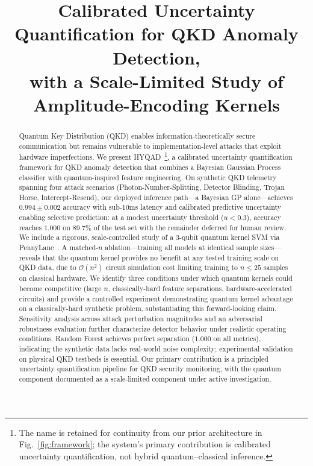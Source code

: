 \documentclass[conference,10pt]{IEEEtran}
\title{Calibrated Uncertainty Quantification for QKD Anomaly Detection,\\
with a Scale-Limited Study of Amplitude-Encoding Kernels}
\author{
  \IEEEauthorblockN{Arnav Kapoor}
  \IEEEauthorblockA{Department of Computer Science\\
  \textit{IISER Bhopal}\\
  Bhopal, India\\
  arnavkapoor23@iiserb.ac.in}
}
\begin{document}
\maketitle

\begin{abstract}
Quantum Key Distribution (QKD) enables information-theoretically secure communication but remains vulnerable to implementation-level attacks that exploit hardware imperfections. We present HYQAD~\footnote{The name is retained for continuity from our prior architecture in Fig.~\ref{fig:framework}; the system's primary contribution is calibrated uncertainty quantification, not hybrid quantum--classical inference.}, a calibrated uncertainty quantification framework for QKD anomaly detection that combines a Bayesian Gaussian Process classifier with quantum-inspired feature engineering. On synthetic QKD telemetry spanning four attack scenarios (Photon-Number-Splitting, Detector Blinding, Trojan Horse, Intercept-Resend), our deployed inference path---a Bayesian GP alone---achieves $0.994 \pm 0.002$ accuracy with sub-10ms latency and calibrated predictive uncertainty enabling selective prediction: at a modest uncertainty threshold ($u < 0.3$), accuracy reaches $1.000$ on $89.7\%$ of the test set with the remainder deferred for human review. We include a rigorous, scale-controlled study of a 3-qubit quantum kernel SVM via PennyLane~\cite{bergholm2018pennylane}. A matched-$n$ ablation---training all models at identical sample sizes---reveals that the quantum kernel provides no benefit at any tested training scale on QKD data, due to $\mathcal{O}(n^2)$ circuit simulation cost limiting training to $n \leq 25$ samples on classical hardware. We identify three conditions under which quantum kernels could become competitive (large $n$, classically-hard feature separations, hardware-accelerated circuits) and provide a controlled experiment demonstrating quantum kernel advantage on a classically-hard synthetic problem, substantiating this forward-looking claim. Sensitivity analysis across attack perturbation magnitudes and an adversarial robustness evaluation further characterize detector behavior under realistic operating conditions. Random Forest achieves perfect separation ($1.000$ on all metrics), indicating the synthetic data lacks real-world noise complexity; experimental validation on physical QKD testbeds is essential. Our primary contribution is a principled uncertainty quantification pipeline for QKD security monitoring, with the quantum component documented as a scale-limited component under active investigation.
\end{abstract}
\end{document}
